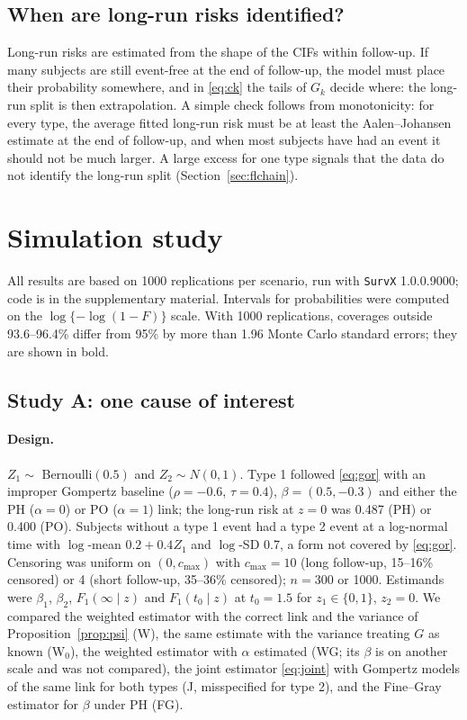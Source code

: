 \documentclass[11pt]{article}
\begin{document}
\subsection{When are long-run risks identified?}\label{sec:ident}
Long-run risks are estimated from the shape of the CIFs within follow-up. If many subjects are
still event-free at the end of follow-up, the model must place their probability somewhere, and
in \eqref{eq:ck} the tails of $G_k$ decide where: the long-run split is then extrapolation. A
simple check follows from monotonicity: for every type, the average fitted long-run risk must be
at least the Aalen--Johansen estimate \citep{aalen1978} at the end of follow-up, and when most
subjects have had an event it should not be much larger. A large excess for one type signals that
the data do not identify the long-run split (Section~\ref{sec:flchain}).

\section{Simulation study}\label{sec:sim}
All results are based on 1000 replications per scenario, run with \texttt{SurvX} 1.0.0.9000; code
is in the supplementary material. Intervals for probabilities were computed on the
$\log\{-\log(1 - F)\}$ scale. With 1000 replications, coverages outside 93.6--96.4\% differ from
95\% by more than 1.96 Monte Carlo standard errors; they are shown in bold.

\subsection{Study A: one cause of interest}\label{sec:simA}
\paragraph{Design.} $Z_1 \sim$ Bernoulli$(0.5)$ and $Z_2 \sim N(0, 1)$. Type 1 followed
\eqref{eq:gor} with an improper Gompertz baseline ($\rho = -0.6$, $\tau = 0.4$),
$\beta = (0.5, -0.3)$ and either the PH ($\alpha = 0$) or PO ($\alpha = 1$) link; the long-run
risk at $z = 0$ was 0.487 (PH) or 0.400 (PO). Subjects without a type 1 event had a type 2 event at a
log-normal time with $\log$-mean $0.2 + 0.4 Z_1$ and $\log$-SD 0.7, a form not covered by
\eqref{eq:gor}. Censoring was uniform on $(0, c_{\max})$ with $c_{\max} = 10$ (long follow-up,
15--16\% censored) or 4 (short follow-up, 35--36\% censored); $n = 300$ or 1000. Estimands were
$\beta_1$, $\beta_2$, $F_1(\infty \mid z)$ and $F_1(t_0 \mid z)$ at $t_0 = 1.5$ for $z_1 \in \{0, 1\}$,
$z_2 = 0$. We compared the weighted estimator with the correct link and the variance of
Proposition~\ref{prop:psi} (W), the same estimate with the variance treating $G$ as known (W$_0$),
the weighted estimator with $\alpha$ estimated (WG; its $\beta$ is on another scale and was not
compared), the joint estimator \eqref{eq:joint} with Gompertz models of the same link for both types
(J, misspecified for type 2), and the Fine--Gray estimator for $\beta$ under PH (FG).
\end{document}
